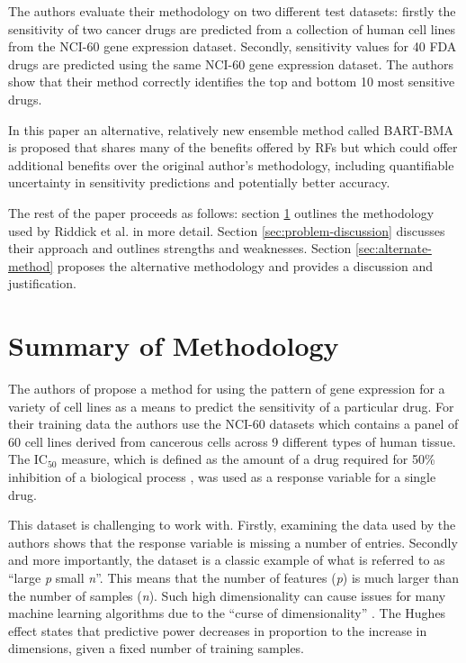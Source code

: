 \documentclass[journal]{IEEEtran}
\begin{document}
The authors evaluate their methodology on two different test datasets: firstly the sensitivity of two cancer drugs are predicted from a collection of human cell lines from the NCI-60 gene expression dataset. Secondly, sensitivity values for 40 FDA drugs are predicted using the same NCI-60 gene expression dataset. The authors show that their method correctly identifies the top and bottom 10 most sensitive drugs. 

In this paper an alternative, relatively new ensemble method called BART-BMA is proposed that shares many of the benefits offered by RFs but which could offer additional benefits over the original author's methodology, including quantifiable uncertainty in sensitivity predictions and potentially better accuracy. 

The rest of the paper proceeds as follows: section \ref{sec:original-methodology} outlines the methodology used by Riddick et al. in more detail. Section \ref{sec:problem-discussion} discusses their approach and outlines strengths and weaknesses. Section \ref{sec:alternate-method} proposes the alternative methodology and provides a discussion and justification.

\section{Summary of Methodology}
\label{sec:original-methodology}

The authors of \cite{riddick2011predicting} propose a method for using the pattern of gene expression for a variety of cell lines as a means to predict the sensitivity of a particular drug. For their training data the authors use the NCI-60 datasets which contains a panel of 60 cell lines derived from cancerous cells across 9 different types of human tissue. The IC$_{50}$ measure, which is defined as the amount of a drug required for 50\% inhibition of a biological process \cite{FDA-IC50}, was used as a response variable for a single drug.

This dataset is challenging to work with. Firstly, examining the data used by the authors shows that the response variable is missing a number of entries. Secondly and more importantly, the dataset is a classic example of what is referred to as ``large \textit{p} small \textit{n}''. This means that the number of features (\textit{p}) is much larger than the number of samples (\textit{n}). Such high dimensionality can cause issues for many machine learning algorithms due to the ``curse of dimensionality'' \cite{bellman1957dynamic}. The Hughes effect \cite{hughes1968mean} states that predictive power decreases in proportion to the increase in dimensions, given a fixed number of training samples.
\end{document}
